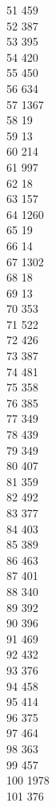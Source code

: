 { 51	459 \\
 52	387 \\
 53	395 \\
 54	420 \\
 55	450 \\
 56	634 \\
 57	1367 \\
 58	19 \\
 59	13 \\
 60	214 \\
 61	997 \\
 62	18 \\
 63	157 \\
 64	1260 \\
 65	19 \\
 66	14 \\
 67	1302 \\
 68	18 \\
 69	13 \\
 70	353 \\
 71	522 \\
 72	426 \\
 73	387 \\
 74	481 \\
 75	358 \\
 76	385 \\
 77	349 \\
 78	439 \\
 79	349 \\
 80	407 \\
 81	359 \\
 82	492 \\
 83	377 \\
 84	403 \\
 85	389 \\
 86	463 \\
 87	401 \\
 88	340 \\
 89	392 \\
 90	396 \\
 91	469 \\
 92	432 \\
 93	376 \\
 94	458 \\
 95	414 \\
 96	375 \\
 97	464 \\
 98	363 \\
 99	457 \\
 100	1978 \\
 101	376 \\
}
